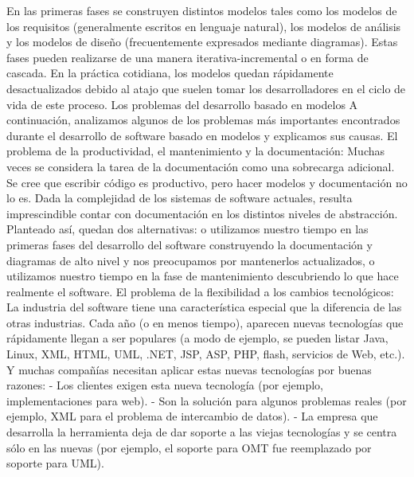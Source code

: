 \begin{enumerate}
En las primeras fases se construyen distintos modelos tales como los modelos de los requisitos (generalmente escritos en lenguaje natural), los modelos de análisis y los modelos de diseño (frecuentemente expresados mediante diagramas). Estas fases pueden realizarse de una manera iterativa-incremental o en forma de cascada. En la práctica cotidiana, los modelos quedan rápidamente desactualizados debido al atajo que suelen tomar los desarrolladores en el ciclo de vida de este proceso.
Los problemas del desarrollo basado en modelos 
A continuación, analizamos algunos de los problemas más importantes encontrados durante el desarrollo de software basado en modelos y explicamos sus causas.
El problema de la productividad, el mantenimiento y la documentación: Muchas veces se considera la tarea de la documentación como una sobrecarga adicional. Se cree que escribir código es productivo, pero hacer modelos y documentación no lo es. Dada la complejidad de los sistemas de software actuales, resulta imprescindible contar con documentación en los distintos niveles de abstracción. Planteado así, quedan dos alternativas: o utilizamos nuestro tiempo en las primeras fases del desarrollo del software construyendo la documentación y diagramas de alto nivel y nos preocupamos por mantenerlos actualizados, o utilizamos nuestro tiempo en la fase de mantenimiento descubriendo lo que hace realmente el software.
El problema de la flexibilidad a los cambios tecnológicos: La industria del software tiene una característica especial que la diferencia de las otras industrias. Cada año (o en menos tiempo), aparecen nuevas tecnologías que rápidamente llegan a ser populares (a modo de ejemplo, se pueden listar Java, Linux, XML, HTML, UML, .NET, JSP, ASP, PHP, flash, servicios de Web, etc.). Y muchas compañías necesitan aplicar estas nuevas tecnologías por buenas razones: - Los clientes exigen esta nueva tecnología (por ejemplo, implementaciones para web). - Son la solución para algunos problemas reales (por ejemplo, XML para el problema de intercambio de datos). - La empresa que desarrolla la herramienta deja de dar soporte a las viejas tecnologías y se centra sólo en las nuevas (por ejemplo, el soporte para OMT fue reemplazado por soporte para UML).


\end{enumerate}

